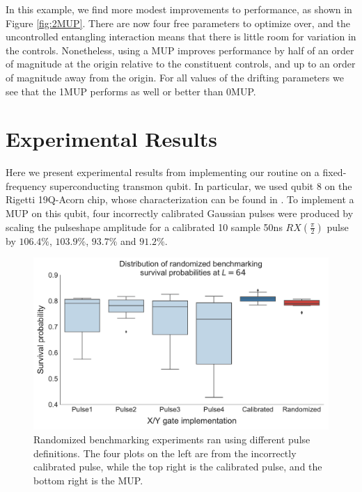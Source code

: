 \documentclass[aps,nofootinbib,pra,notitlepage,twocolumn]{revtex4-1}
\begin{document}
In this example, we find more modest improvements to performance, as shown in Figure \ref{fig:2MUP}. There are now four free parameters to optimize over, and the uncontrolled entangling interaction means that there is little room for variation in the controls. Nonetheless, using a MUP improves performance by half of an order of magnitude at the origin relative to the constituent controls, and up to an order of magnitude away from the origin. For all values of the drifting parameters we see that the 1MUP performs as well or better than 0MUP.


\section{Experimental Results}
\label{sec:experimental_results}
Here we present experimental results from implementing our routine on a fixed-frequency superconducting transmon qubit. In particular, we used qubit 8 on the Rigetti 19Q-Acorn chip, whose characterization can be found in \cite{1712.05771}. To implement a MUP on this qubit, four incorrectly calibrated Gaussian pulses were produced by scaling the pulseshape amplitude for a calibrated 10 sample 50ns $RX(\frac{\pi}{2})$ pulse by $106.4\%$,  $103.9\%$, $93.7\%$ and $91.2\%$.


\begin{figure}
  \centering
  \includegraphics[width=\columnwidth]{rb_data.pdf}
  \caption{Randomized benchmarking experiments ran using different pulse definitions. The four plots on the left are from the incorrectly calibrated pulse, while the top right is the calibrated pulse, and the bottom right is the MUP.}
  \label{fig:rb}
\end{figure}
\end{document}
